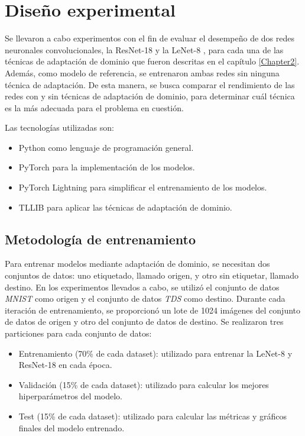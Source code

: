 \section{Diseño experimental}

Se llevaron a cabo experimentos con el fin de evaluar el desempeño de dos redes neuronales convolucionales, la
ResNet-18 \parencite{he2016deep} y la LeNet-8 \parencite{lecun1998gradient}, para cada una de las técnicas de adaptación de dominio que fueron descritas en el capítulo
\ref{Chapter2}. Además, como modelo de referencia, se entrenaron ambas redes sin ninguna técnica de adaptación. De esta
manera, se busca comparar el rendimiento de las redes con y sin técnicas de adaptación de dominio, para determinar cuál
técnica es la más adecuada para el problema en cuestión.

Las tecnologías utilizadas son:

\begin{itemize}
    \item Python como lenguaje de programación general.
    \item PyTorch \parencite{paszke2019pytorch} para la implementación de los modelos.
    \item PyTorch Lightning \parencite{falcon2019pytorch-lightning} para simplificar el entrenamiento de los modelos.
    \item TLLIB \parencite{tllib} para aplicar las técnicas de adaptación de dominio.
\end{itemize}

\subsection{Metodología de entrenamiento}

Para entrenar modelos mediante adaptación de dominio, se necesitan dos conjuntos de datos: uno etiquetado, llamado
origen, y otro sin etiquetar, llamado destino. En los experimentos llevados a cabo, se utilizó el conjunto de datos
    {\it MNIST} como origen y el conjunto de datos {\it TDS} como destino. Durante cada iteración de entrenamiento, se
proporcionó un lote de 1024 imágenes del conjunto de datos de origen y otro del conjunto de datos de destino. Se
realizaron tres particiones para cada conjunto de datos:

\begin{itemize}
    \item Entrenamiento (70\% de cada dataset): utilizado para entrenar la LeNet-8 y ResNet-18 en cada época.
    \item Validación (15\% de cada dataset): utilizado para calcular los mejores hiperparámetros del modelo.
    \item Test (15\% de cada dataset): utilizado para calcular las métricas y gráficos finales del modelo entrenado.
\end{itemize}

